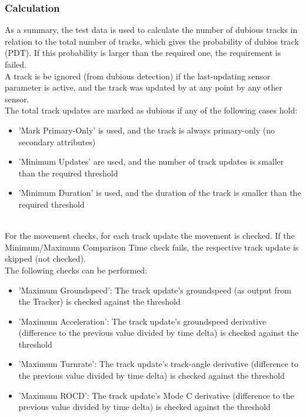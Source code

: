 \subsubsection{Calculation}

As a summary, the test data is used to calculate the number of dubious tracks in relation to the total number of tracks, which gives the probability of dubios track (PDT). If this probability is larger than the required one, the requirement is failed. \\

A track is be ignored (from dubious detection) if the last-updating sensor parameter is active, and the track was updated by at any point by any other sensor. \\

The total track updates are marked as dubious if any of the following cases hold:
\begin{itemize}  
\item 'Mark Primary-Only' is used, and the track is always primary-only (no secondary attributes)
\item 'Minimum Updates' are used, and the number of track updates is smaller than the required threshold
\item 'Minimum Duration' is used, and the duration of the track is smaller than the required threshold
\end{itemize}
\ \\

For the movement checks, for each track update the movement is checked. If the Minimum/Maximum Comparison Time check fails, the respective track update is skipped (not checked). \\ 

The following checks can be performed:
\begin{itemize}  
\item 'Maximum Groundspeed': The track update's groundspeed (as output from the Tracker) is checked against the threshold
\item 'Maximum Acceleration': The track update's groundspeed derivative (difference to the previous value divided by time delta) is checked against the threshold
\item 'Maximum Turnrate': The track update's track-angle derivative (difference to the previous value divided by time delta) is checked against the threshold
\item 'Maximum ROCD': The track update's Mode C derivative (difference to the previous value divided by time delta) is checked against the threshold
\end{itemize}
\ \\

